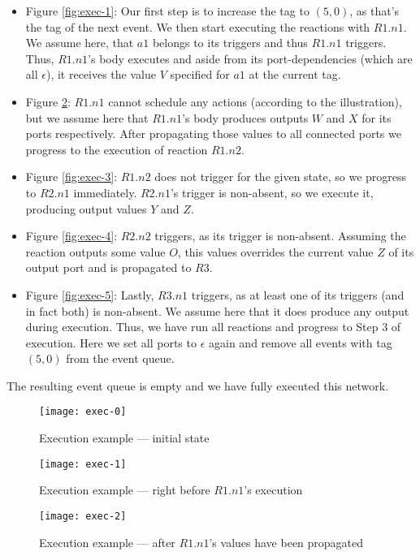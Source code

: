 \begin{itemize}[leftmargin=0pt]
    \item[] Figure \ref{fig:exec-1}: 
    Our first step is to increase the tag to $(5,0)$, as that's the tag of the next event.
    We then start executing the reactions with $R1.n1$.
    We assume here, that $a1$ belongs to its triggers and thus $R1.n1$ triggers.
    Thus, $R1.n1$'s body executes and aside from its port-dependencies (which are all $\epsilon$), it receives the value $V$ specified for $a1$ at the current tag. 
    \item[] Figure \ref{fig:exec-2}: 
    $R1.n1$ cannot schedule any actions (according to the illustration), but we assume here that $R1.n1$'s body produces outputs $W$ and $X$ for its ports respectively.
    After propagating those values to all connected ports we progress to the execution of reaction $R1.n2$. 
    \item[] Figure \ref{fig:exec-3}:
    $R1.n2$ does not trigger for the given state, so we progress to $R2.n1$ immediately.
    $R2.n1$'s trigger is non-absent, so we execute it, producing output values $Y$ and $Z$.
    \item[] Figure \ref{fig:exec-4}:
    $R2.n2$ triggers, as its trigger is non-absent.
    Assuming the reaction outputs some value $O$, this values overrides the current value $Z$ of its output port and is propagated to $R3$.
    \item[] Figure \ref{fig:exec-5}:
    Lastly, $R3.n1$ triggers, as at least one of its triggers (and in fact both) is non-absent.
    We assume here that it does produce any output during execution.
    Thus, we have run all reactions and progress to Step 3 of execution.
    Here we set all ports to $\epsilon$ again and remove all events with tag $(5,0)$ from the event queue. 
\end{itemize} 

\noindent The resulting event queue is empty and we have fully executed this network.

\begin{figure}[!htbp]
\centering
\texttt{[image: exec-0]}
\caption{Execution example --- initial state}
\label{fig:exec-0}
\end{figure}

\begin{figure}[!htbp]
\centering
\texttt{[image: exec-1]}
\caption{Execution example --- right before $R1.n1$'s execution}
\label{fig:exec-1}
\texttt{[image: exec-2]}
\caption{Execution example --- after $R1.n1$'s values have been propagated}
\label{fig:exec-2}
\end{figure}

